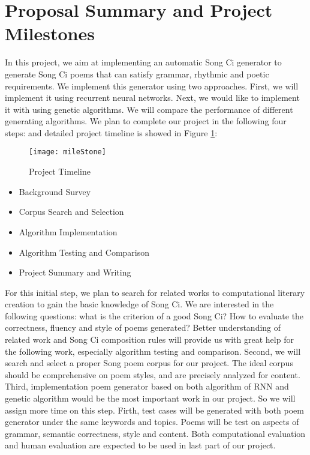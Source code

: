 \section{Proposal Summary and Project Milestones}
In this project, we aim at implementing an automatic Song Ci generator to generate Song Ci poems that can satisfy grammar, rhythmic and poetic requirements.
%
We implement this generator using two approaches. First, we will implement it using recurrent neural networks.
%
Next, we would like to implement it with using genetic algorithms.
%
We will compare the performance of different generating algorithms.
%
We plan to complete our project in the following four steps:
and detailed project timeline is showed in Figure \ref{fig:projecttimeline}:
\begin{figure}[htbp]
	\centering
	\texttt{[image: mileStone]}
	\caption{Project Timeline}
	\label{fig:projecttimeline}	
\end{figure} 
\begin{itemize}
\item Background Survey
\item Corpus Search and Selection
\item Algorithm Implementation
\item Algorithm Testing and Comparison
\item Project Summary and Writing
\end{itemize}

For this initial step, we plan to search for related works to computational literary creation to gain the basic knowledge of Song Ci.
%
We are interested in the following questions: what is the criterion of a good Song Ci? How to evaluate the correctness, fluency and style of poems generated?
%
Better understanding of related work and Song Ci composition rules will provide us with great help for the following work, especially algorithm testing and comparison. 
%
Second, we will search and select a proper Song poem corpus for our project. The ideal corpus should be comprehensive on poem styles, and are precisely analyzed for content. 
%
Third, implementation poem generator based on both algorithm of RNN and genetic algorithm would be the most important work in our project. So we will assign more time on this step. 
%
Firth, test cases will be generated with both poem generator under the same keywords and topics. Poems will be test on aspects of grammar, semantic correctness, style and content. Both computational evaluation and human evaluation are expected to be used in last part of our project. 
